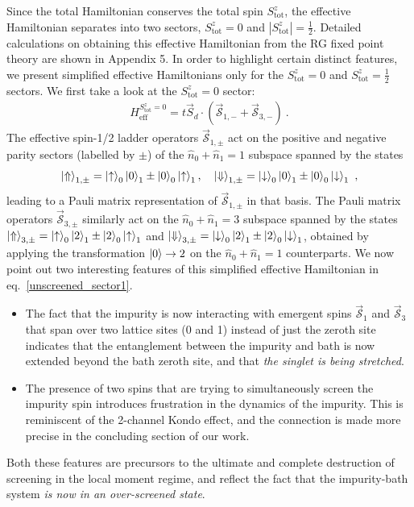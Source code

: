 Since the total Hamiltonian conserves the total spin \(S_\text{tot}^z\), the effective Hamiltonian separates into two sectors, \(S_\text{tot}^z = 0\) and \(|S_\text{tot}^z| = \frac{1}{2}\). Detailed calculations on obtaining this effective Hamiltonian from the RG fixed point theory are shown in Appendix 5. In order to highlight certain distinct features, we present simplified effective Hamiltonians only for the \(S_\text{tot}^z = 0\) and \(S_\text{tot}^z = \frac{1}{2}\) sectors. We first take a look at the \(S^z_\text{tot}=0\) sector:
\begin{eqnarray}
	H_\text{eff}^{S^z_\text{tot}=0} = t\vec{S}_d\cdot\left(\vec{\mathcal{S}}_{1,-} + \vec{\mathcal{S}}_{3,-}\right)
	\label{unscreened_sector1}~.
\end{eqnarray}
The effective spin-1/2 ladder operators \(\vec{\mathcal{S}}_{1,\pm}\) act on the positive and negative parity sectors (labelled by $\pm$) of the \(\hat n_0 + \hat n_1 = 1\) subspace spanned by the states
\begin{eqnarray}
	\ket{\Uparrow}_{1,\pm} = \ket{\uparrow}_0\ket{0}_1 \pm \ket{0}_0\ket{\uparrow}_1, \quad \ket{\Downarrow}_{1,\pm} = \ket{\downarrow}_0\ket{0}_1 \pm \ket{0}_0\ket{\downarrow}_1~,
\end{eqnarray}
leading to a Pauli matrix representation of $\vec{\mathcal{S}}_{1,\pm}$ in that basis.
The Pauli matrix operators \(\vec{\mathcal{S}}_{3,\pm}\) similarly act on the \(\hat n_0 + \hat n_1 = 3\) subspace spanned by the states \(\ket{\Uparrow}_{3,\pm} = \ket{\uparrow}_0\ket{2}_1 \pm \ket{2}_0\ket{\uparrow}_1\) and \(\ket{\Downarrow}_{3,\pm} = \ket{\downarrow}_0\ket{2}_1 \pm \ket{2}_0\ket{\downarrow}_1\), obtained by applying the transformation \(\ket{0} \to {2}\) on the \(\hat n_0 + \hat n_1 = 1\) counterparts. 
We now point out two interesting features of this simplified effective Hamiltonian in eq.~\eqref{unscreened_sector1}.
\begin{itemize}
	\item The fact that the impurity is now interacting with emergent spins \(\vec{\mathcal{S}}_1\) and \(\vec{\mathcal{S}}_3\) that span over two lattice sites (0 and 1) instead of just the zeroth site indicates that the entanglement between the impurity and bath is now extended beyond the bath zeroth site, and that {\it the singlet is being stretched}. 
	\item The presence of two spins that are trying to simultaneously screen the impurity spin introduces frustration in the dynamics of the impurity. This is reminiscent of the 2-channel Kondo effect, and the connection is made more precise in the concluding section of our work. 
\end{itemize}
Both these features are precursors to the ultimate and complete destruction of screening in the local moment regime, and reflect the fact that the impurity-bath system {\it is now in an over-screened state}.

